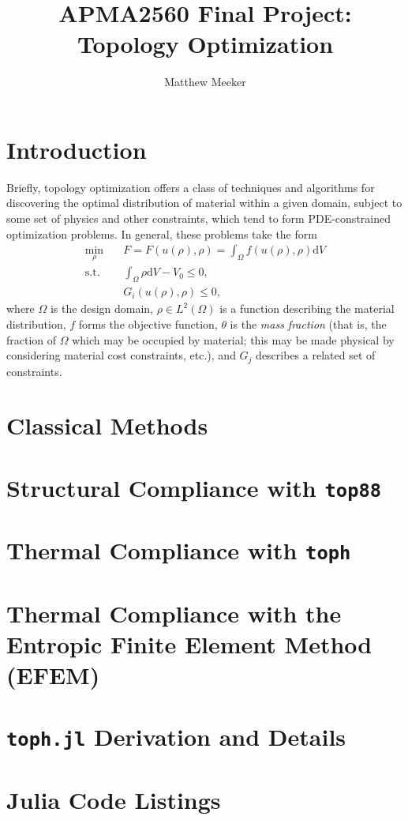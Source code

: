 \documentclass{amsart}
\title{APMA2560 Final Project: Topology Optimization}
\author{Matthew Meeker}
\begin{document}
\maketitle

\section{Introduction}

Briefly, topology optimization offers a class of techniques and algorithms for discovering the optimal distribution of
material within a given domain, subject to some set of physics and other constraints, which tend to form
PDE-constrained optimization problems. In general, these problems take the form
\begin{equation}\label{eq:general_problem}
    \begin{aligned}
        \min_{\rho} &\quad F = F(u(\rho), \rho)=\int_\Omega f(u(\rho), \rho)\mathrm{d}V\\
        \text{s.t.} &\quad \int_\Omega \rho \mathrm{d}V - V_0 \leq 0,\\
         &\quad G_i(u(\rho), \rho) \leq 0,
    \end{aligned}
\end{equation}
where $\Omega$ is the design domain, $\rho \in L^2(\Omega)$ is a function describing the material distribution,
$f$ forms the objective function, $\theta$ is the \textit{mass fraction} (that is, the fraction of $\Omega$
which may be occupied by material; this may be made physical by considering material cost constraints, etc.),
and $G_j$ describes a related set of constraints.

\tableofcontents

\section{Classical Methods}

\section{Structural Compliance with \texttt{top88}}

\section{Thermal Compliance with \texttt{toph}}


\section{Thermal Compliance with the Entropic Finite Element Method (EFEM)}




\printbibliography

\appendix
\section{\texttt{toph.jl} Derivation and Details}\label{sec:toph_appendix}


\section{Julia Code Listings}\label{sec:Julia_Listings}

\end{document}
